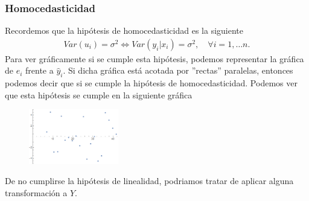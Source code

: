\subsubsection{Homocedasticidad}
Recordemos que la hipótesis de homocedasticidad es la siguiente
\begin{align*}
    Var(u_i) = \sigma^2 \Longleftrightarrow Var(y_i | x_i) = \sigma^2, \quad \forall i = 1, \dots n.
\end{align*}
Para ver gráficamente si se cumple esta hipótesis, podemos representar la gráfica de $e_i$ frente a $\widehat{y}_i$. Si dicha gráfica está acotada por ''rectas'' paralelas, entonces podemos decir que si se cumple la hipótesis de homocedasticidad. Podemos ver que esta hipótesis se cumple en la siguiente gráfica
\begin{figure}[H]
    \centering
    \includegraphics[width=0.35\textwidth]{imagenes1/linealidady.png}
\end{figure}

De no cumplirse la hipótesis de linealidad, podriamos tratar de aplicar alguna transformación a $Y$.

